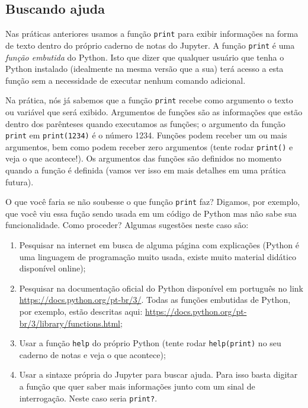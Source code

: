 \documentclass[11pt]{article}
\begin{document}
\subsection{Buscando ajuda}
\label{sec:org2ae34a7}

Nas práticas anteriores usamos a função \texttt{print} para exibir informações na forma de texto dentro do próprio caderno de notas do Jupyter. A função \texttt{print} é uma \emph{função embutida} do Python. Isto que dizer que qualquer usuário que tenha o Python instalado (idealmente na mesma versão que a sua) terá acesso a esta função sem a necessidade de executar nenhum comando adicional.

Na prática, nós já sabemos que a função \texttt{print} recebe como argumento o texto ou variável que será exibido. Argumentos de funções são as informações que estão dentro dos parênteses quando executamos as funções; o argumento da função \texttt{print} em \texttt{print(1234)} é o número 1234. Funções podem receber um ou mais argumentos, bem como podem receber zero argumentos (tente rodar \texttt{print()} e veja o que acontece!). Os argumentos das funções são definidos no momento quando a função é definida (vamos ver isso em mais detalhes em uma prática futura).

O que você faria se não soubesse o que função \texttt{print} faz? Digamos, por exemplo, que você viu essa fução sendo usada em um código de Python mas não sabe sua funcionalidade. Como proceder? Algumas sugestões neste caso são:

\begin{enumerate}
\item Pesquisar na internet em busca de alguma página com explicações (Python é uma linguagem de programação muito usada, existe muito material didático disponível online);
\item Pesquisar na documentação oficial do Python disponível em português no link \url{https://docs.python.org/pt-br/3/}. Todas as funções embutidas de Python, por exemplo, estão descritas aqui: \url{https://docs.python.org/pt-br/3/library/functions.html};
\item Usar a função \texttt{help} do próprio Python (tente rodar \texttt{help(print)} no seu caderno de notas e veja o que acontece);
\item Usar a sintaxe própria do Jupyter para buscar ajuda. Para isso basta digitar a função que quer saber mais informações junto com um sinal de interrogação. Neste caso seria \texttt{print?}.
\end{enumerate}
\end{document}
